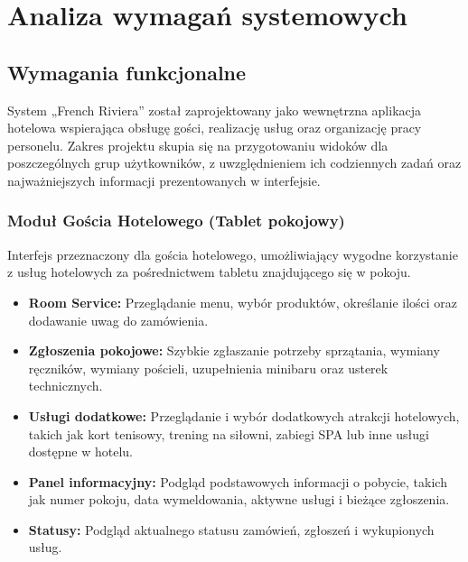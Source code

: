 \chapter{Analiza wymagań systemowych}

\section{Wymagania funkcjonalne}
System „French Riviera” został zaprojektowany jako wewnętrzna aplikacja hotelowa wspierająca obsługę gości, realizację usług oraz organizację pracy personelu. Zakres projektu skupia się na przygotowaniu widoków dla poszczególnych grup użytkowników, z uwzględnieniem ich codziennych zadań oraz najważniejszych informacji prezentowanych w interfejsie.

\subsection{Moduł Gościa Hotelowego (Tablet pokojowy)}
Interfejs przeznaczony dla gościa hotelowego, umożliwiający wygodne korzystanie z usług hotelowych za pośrednictwem tabletu znajdującego się w pokoju.
\begin{itemize}
    \item \textbf{Room Service:} Przeglądanie menu, wybór produktów, określanie ilości oraz dodawanie uwag do zamówienia.
    \item \textbf{Zgłoszenia pokojowe:} Szybkie zgłaszanie potrzeby sprzątania, wymiany ręczników, wymiany pościeli, uzupełnienia minibaru oraz usterek technicznych.
    \item \textbf{Usługi dodatkowe:} Przeglądanie i wybór dodatkowych atrakcji hotelowych, takich jak kort tenisowy, trening na siłowni, zabiegi SPA lub inne usługi dostępne w hotelu.
    \item \textbf{Panel informacyjny:} Podgląd podstawowych informacji o pobycie, takich jak numer pokoju, data wymeldowania, aktywne usługi i bieżące zgłoszenia.
    \item \textbf{Statusy:} Podgląd aktualnego statusu zamówień, zgłoszeń i wykupionych usług.
\end{itemize}

